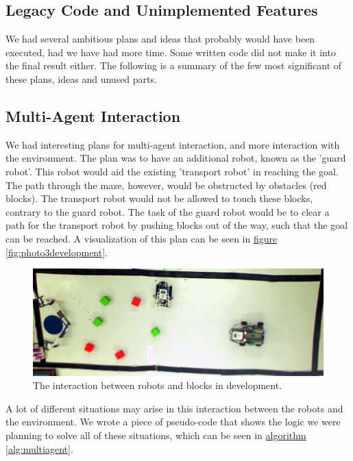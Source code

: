 \documentclass[10pt, abstracton, twocolumn]{scrartcl}
\newcommand{\fref}[1]{\hyperref[#1]{figure \vref{#1}}}
\newcommand{\aref}[1]{\hyperref[#1]{algorithm \vref{#1}}}
\begin{document}
\begin{appendices}

\section{Legacy Code and Unimplemented Features}
We had several ambitious plans and ideas that probably would have been executed, had we have had more time. Some written code did not make it into the final result either. The following is a summary of the few most significant of these plans, ideas and unused parts.

\subsection{Multi-Agent Interaction}
\label{sec:multiagent}
We had interesting plans for multi-agent interaction, and more interaction with the environment. The plan was to have an additional robot, known as the 'guard robot'. This robot would aid the existing 'transport robot' in reaching the goal. The path through the maze, however, would be obstructed by obstacles (red blocks). The transport robot would not be allowed to touch these blocks, contrary to the guard robot. The task of the guard robot would be to clear a path for the transport robot by pushing blocks out of the way, such that the goal can be reached. A visualization of this plan can be seen in \fref{fig:photo3development}.

\begin{figure}
	\centering
	\includegraphics[width=\textwidth]{pictures/photo3development.png}
	\caption{\small The interaction between robots and blocks in development.}
	\label{fig:photo3development}
\end{figure}

A lot of different situations may arise in this interaction between the robots and the environment. We wrote a piece of pseudo-code that shows the logic we were planning to solve all of these situations, which can be seen in \aref{alg:multiagent}.


\end{appendices}
\end{document}
